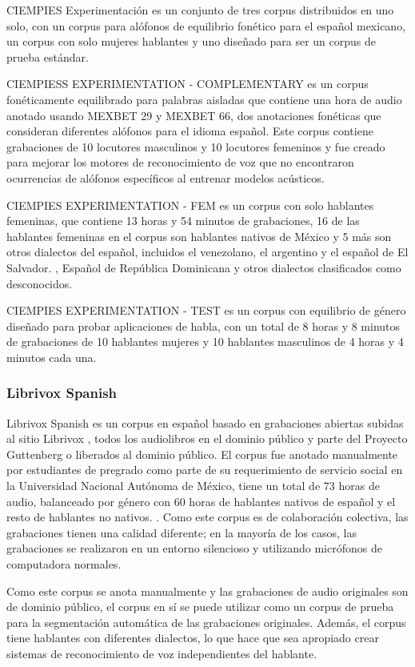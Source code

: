 \documentclass[a4paper,12pt,twoside]{report}
\begin{document}
CIEMPIES Experimentación es un conjunto de tres corpus distribuidos en uno solo, con un corpus para alófonos de equilibrio fonético para el español mexicano, un corpus con solo mujeres hablantes y uno diseñado para ser un corpus de prueba estándar.

CIEMPIESS EXPERIMENTATION - COMPLEMENTARY es un corpus fonéticamente equilibrado para palabras aisladas que contiene una hora de audio anotado usando MEXBET 29 y MEXBET 66, dos anotaciones fonéticas que consideran diferentes alófonos para el idioma español. Este corpus contiene grabaciones de 10 locutores masculinos y 10 locutores femeninos y fue creado para mejorar los motores de reconocimiento de voz que no encontraron ocurrencias de alófonos específicos al entrenar modelos acústicos.

CIEMPIES EXPERIMENTATION  - FEM es un corpus con solo hablantes femeninas, que contiene 13 horas y 54 minutos de grabaciones, 16 de las hablantes femeninas en el corpus son hablantes nativos de México y 5 más son otros dialectos del español, incluidos el venezolano, el argentino y el español de El Salvador. , Español de República Dominicana y otros dialectos clasificados como desconocidos.

CIEMPIES EXPERIMENTATION  - TEST es un corpus con equilibrio de género diseñado para probar aplicaciones de habla, con un total de 8 horas y 8 minutos de grabaciones de 10 hablantes mujeres y 10 hablantes masculinos de 4 horas y 4 minutos cada una.

\subsubsection {Librivox Spanish}

Librivox Spanish es un corpus en español basado en grabaciones abiertas subidas al sitio Librivox \cite{LibriVox}, todos los audiolibros en el dominio público y parte del Proyecto Guttenberg \cite{gutenberg} o liberados al dominio público. El corpus fue anotado manualmente por estudiantes de pregrado como parte de su requerimiento de servicio social en la Universidad Nacional Autónoma de México, tiene un total de 73 horas de audio, balanceado por género con 60 horas de hablantes nativos de español y el resto de hablantes no nativos. . Como este corpus es de colaboración colectiva, las grabaciones tienen una calidad diferente; en la mayoría de los casos, las grabaciones se realizaron en un entorno silencioso y utilizando micrófonos de computadora normales.

Como este corpus se anota manualmente y las grabaciones de audio originales son de dominio público, el corpus en sí se puede utilizar como un corpus de prueba para la segmentación automática de las grabaciones originales. Además, el corpus tiene hablantes con diferentes dialectos, lo que hace que sea apropiado crear sistemas de reconocimiento de voz independientes del hablante.
\end{document}
